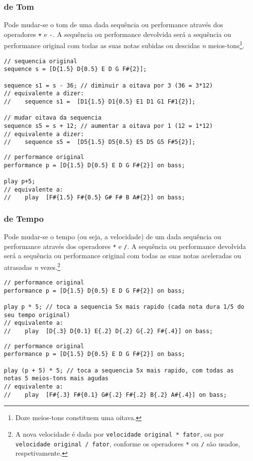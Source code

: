 \documentclass{article}
\begin{document}
\subsubsection{de Tom}
Pode mudar-se o tom de uma dada sequência ou performance através dos operadores \texttt{+} e \texttt{-}. A sequência ou performance devolvida será a sequência ou performance original com todas as suas notas subidas ou descidas \textit{n} meios-tons\footnote{Doze meios-tons constituem uma oitava.}.
\begin{lstlisting} 
// sequencia original
sequence s = [D{1.5} D{0.5} E D G F#{2}];

sequence s1 = s - 36; // diminuir a oitava por 3 (36 = 3*12)
// equivalente a dizer:
//    sequence s1 =  [D1{1.5} D1{0.5} E1 D1 G1 F#1{2}];

// mudar oitava da sequencia
sequence s5 = s + 12; // aumentar a oitava por 1 (12 = 1*12)
// equivalente a dizer:
//    sequence s5 =  [D5{1.5} D5{0.5} E5 D5 G5 F#5{2}];
\end{lstlisting}
\begin{lstlisting} 
// performance original
performance p = [D{1.5} D{0.5} E D G F#{2}] on bass;

play p+5;
// equivalente a:
//    play  [F#{1.5} F#{0.5} G# F# B A#{2}] on bass;
\end{lstlisting}

\subsubsection{de Tempo}
Pode mudar-se o tempo (ou seja, a velocidade) de um dada sequência ou performance através dos operadores \texttt{*} e \texttt{/}. A sequência ou performance devolvida será a sequência ou performance original com todas as suas notas aceleradas ou atrasadas \textit{n} vezes.\footnote{A nova velocidade é dada por \texttt{velocidade original * fator}, ou por \texttt{velocidade original / fator}, conforme os operadores \texttt{*} ou \texttt{/} são usados, respetivamente.}
\begin{lstlisting} 
// performance original
performance p = [D{1.5} D{0.5} E D G F#{2}] on bass;

play p * 5; // toca a sequencia 5x mais rapido (cada nota dura 1/5 do seu tempo original)
// equivalente a:
//    play  [D{.3} D{0.1} E{.2} D{.2} G{.2} F#{.4}] on bass;
\end{lstlisting}

\begin{lstlisting} 
// performance original
performance p = [D{1.5} D{0.5} E D G F#{2}] on bass;

play (p + 5) * 5; // toca a sequencia 5x mais rapido, com todas as notas 5 meios-tons mais agudas
// equivalente a:
//    play  [F#{.3} F#{0.1} G#{.2} F#{.2} B{.2} A#{.4}] on bass;
\end{lstlisting}
\end{document}
